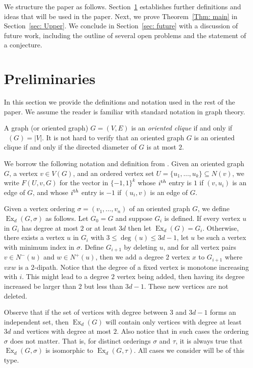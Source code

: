 \documentclass[11pt]{article}
\theoremstyle{definition}
\DeclareMathOperator{\chio}{\chi_o}
\DeclareMathOperator{\ex}{\text{Ex}}
\begin{document}
We structure the paper as follows.
Section~\ref{sec: Pre} establishes further definitions and ideas that will be used in the paper.
Next, we prove Theorem~\ref{Thm: main} in Section~\ref{sec: Upper}.
We conclude in Section~\ref{sec: future} with a discussion of future work,
including the outline of several open problems and the statement of a conjecture.

\section{Preliminaries}
\label{sec: Pre}

In this section we provide the definitions and notation used in the rest of the paper.
We assume the reader is familiar with standard notation in graph theory. 


A graph (or oriented graph) $G = (V,E)$ is an \emph{oriented clique} if and only if $\chio(G) = |V|$. It is not hard to verify that an oriented graph $G$ is an oriented clique if and only if the directed diameter of $G$ is at most $2$. 

We borrow the following notation and definition from \cite{CLOW2026}.
Given an oriented graph $G$, a vertex $v \in V(G)$, and an ordered vertex set 
$U = \{u_1, \dots, u_k\} \subseteq N(v)$, 
we write $F(U,v,G)$ for the vector in $\{-1,1\}^k$
whose $i^{\text th}$ entry is $1$ if $(v,u_i)$ is an edge of $G$, and whose $i^{\text th}$ entry is $-1$ if $(u_i,v)$ is an edge of $G$. 


Given a vertex ordering $\sigma = (v_1,\dots, v_n)$ of an oriented graph $G$, we define $\ex_d(G,\sigma)$ as follows.
Let $G_0 = G$ and suppose $G_i$ is defined.
If every vertex $u$ in $G_i$ has degree at most $2$ or at least $3d$ then let $\ex_d(G) = G_i$.
Otherwise, there exists a vertex $u$ in $G_i$ with $3 \leq \deg(u) \leq  3d-1$, let $u$ be such a vertex with minimum index in $\sigma$.
Define $G_{i+1}$ by deleting $u$,
and for all vertex pairs $v \in N^-(u)$ and $w \in N^+(u)$, then we add a degree $2$ vertex $x$ to $G_{i+1}$ where $vxw$ is a $2$-dipath.
Notice that the degree of a fixed vertex is monotone increasing with $i$.
This might lead to a degree $2$ vertex being added, then having its degree increased be larger than $2$ but less than $3d-1$.
These new vertices are not deleted.

Observe that if the set of vertices with degree between $3$ and $3d-1$ forms an independent set,
then $\ex_d(G)$ will contain only vertices with degree at least $3d$ and vertices with degree at most $2$.
Also notice that in such cases the ordering $\sigma$ does not matter. That is, for distinct orderings $\sigma$ and $\tau$,
it is always true that $\ex_d(G,\sigma)$ is isomorphic to $\ex_d(G,\tau)$.
All cases we consider will be of this type.
\end{document}
